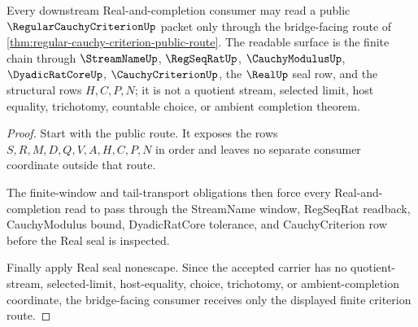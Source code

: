 \begin{theorem}
\label{thm:regular-cauchy-criterion-bridged-consumer}
Every downstream Real-and-completion consumer may read a public $\RegularCauchyCriterionUp$ packet only through the bridge-facing route of \autoref{thm:regular-cauchy-criterion-public-route}. The readable surface is the finite chain through $\StreamNameUp$, $\RegSeqRatUp$, $\CauchyModulusUp$, $\DyadicRatCoreUp$, $\CauchyCriterionUp$, the $\RealUp$ seal row, and the structural rows $H,C,P,N$; it is not a quotient stream, selected limit, host equality, trichotomy, countable choice, or ambient completion theorem.
\end{theorem}
\begin{proof}
Start with the public route. It exposes the rows $S,R,M,D,Q,V,A,H,C,P,N$ in order and leaves no separate consumer coordinate outside that route.

The finite-window and tail-transport obligations then force every Real-and-completion read to pass through the StreamName window, RegSeqRat readback, CauchyModulus bound, DyadicRatCore tolerance, and CauchyCriterion row before the Real seal is inspected.

Finally apply Real seal nonescape. Since the accepted carrier has no quotient-stream, selected-limit, host-equality, choice, trichotomy, or ambient-completion coordinate, the bridge-facing consumer receives only the displayed finite criterion route.
\end{proof}

